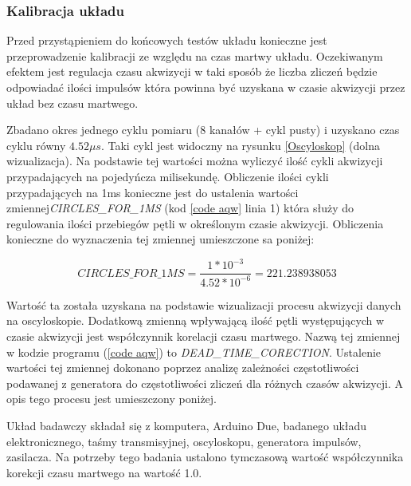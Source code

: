 \subsubsection{Kalibracja układu}
\label{section kaliblracja}

Przed przystąpieniem do końcowych testów układu konieczne jest przeprowadzenie kalibracji ze względu na czas martwy układu. 
Oczekiwanym efektem jest regulacja czasu akwizycji w taki sposób że liczba zliczeń będzie odpowiadać ilości impulsów która powinna być uzyskana w czasie akwizycji przez układ bez czasu martwego. 

Zbadano okres jednego cyklu pomiaru (8 kanałów + cykl pusty) i uzyskano czas cyklu równy $4.52 \mu s$. Taki cykl jest widoczny na rysunku \ref{Oscyloskop} (dolna wizualizacja).
Na podstawie tej wartości można wyliczyć ilość cykli akwizycji przypadających na pojedyńcza milisekundę. Obliczenie ilości cykli przypadających na 1ms konieczne jest do ustalenia wartości zmiennej\textit{CIRCLES\_FOR\_1MS} (kod \ref{code aqw} linia 1) która służy do regulowania ilości przebiegów pętli w określonym czasie akwizycji. Obliczenia konieczne do wyznaczenia tej zmiennej umieszczone sa poniżej:

\begin{equation}
        \label{per cykl}
        CIRCLES\_FOR\_1MS = \frac{1*10^{-3}}{4.52 * 10^{-6}} = 221.238938053
\end{equation}


Wartość ta została uzyskana na podstawie wizualizacji procesu akwizycji danych na oscyloskopie. Dodatkową zmienną wpływającą ilość pętli występujących w czasie akwizycji jest współczynnik korelacji czasu martwego. Nazwą tej zmiennej w kodzie programu (\ref{code aqw}) to \textit{DEAD\_TIME\_CORECTION}. Ustalenie wartości tej zmiennej dokonano poprzez analizę zależności częstotliwości podawanej z generatora do częstotliwości zliczeń dla różnych czasów akwizycji. A opis tego procesu jest umieszczony poniżej.

Układ badawczy składał się z komputera, Arduino Due, badanego układu elektronicznego, taśmy transmisyjnej, oscyloskopu, generatora impulsów, zasilacza. Na potrzeby tego badania ustalono tymczasową wartość współczynnika korekcji czasu martwego na wartość 1.0.


